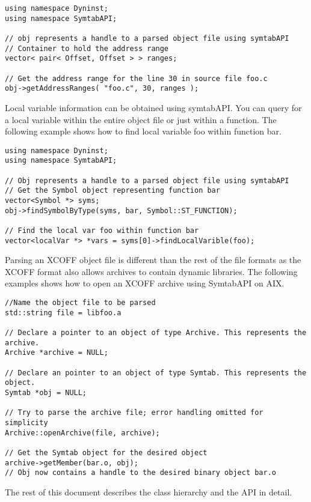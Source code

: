 \begin{lstlisting}
using namespace Dyninst;
using namespace SymtabAPI;

// obj represents a handle to a parsed object file using symtabAPI
// Container to hold the address range
vector< pair< Offset, Offset > > ranges;

// Get the address range for the line 30 in source file foo.c
obj->getAddressRanges( "foo.c", 30, ranges );
\end{lstlisting}

Local variable information can be obtained using symtabAPI. You can query for a local variable within the entire object file or just within a function. The following example shows how to find local variable foo within function bar.

\begin{lstlisting}
using namespace Dyninst;
using namespace SymtabAPI;

// Obj represents a handle to a parsed object file using symtabAPI
// Get the Symbol object representing function bar
vector<Symbol *> syms;
obj->findSymbolByType(syms, bar, Symbol::ST_FUNCTION);

// Find the local var foo within function bar
vector<localVar *> *vars = syms[0]->findLocalVarible(foo);
\end{lstlisting}

Parsing an XCOFF object file is different than the rest of the file formats as the XCOFF format also allows archives to contain dynamic libraries. The following examples shows how to open an XCOFF archive using SymtabAPI on AIX.

\begin{lstlisting}
//Name the object file to be parsed
std::string file = libfoo.a

// Declare a pointer to an object of type Archive. This represents the archive.
Archive *archive = NULL;

// Declare an pointer to an object of type Symtab. This represents the object.
Symtab *obj = NULL;

// Try to parse the archive file; error handling omitted for simplicity
Archive::openArchive(file, archive);

// Get the Symtab object for the desired object
archive->getMember(bar.o, obj);
// Obj now contains a handle to the desired binary object bar.o
\end{lstlisting}

The rest of this document describes the class hierarchy and the API in detail.

